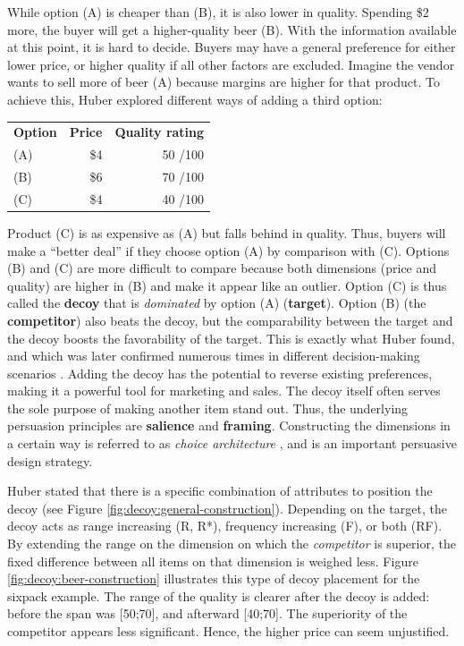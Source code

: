 While option (A) is cheaper than (B), it is also lower in quality. Spending \$2 more, the buyer will get a higher-quality beer (B). With the information available at this point, it is hard to decide. 
Buyers may have a general preference for either lower price, or higher quality if all other factors are excluded. Imagine the vendor wants to sell more of beer (A) because margins are higher for that product. To achieve this, Huber \etal explored different ways of adding a third option:
\begin{table}[!h]
\begin{tabular}{lrr}
	\textbf{Option} & \textbf{Price} & \textbf{Quality rating}\\
	(A) & \$4 & 50 \small{/100} \\
	(B) & \$6 & 70 \small{/100}\\
	(C) & \$4 & 40 \small{/100} \\
\end{tabular} 
\end{table}

Product (C) is as expensive as (A) but falls behind in quality. Thus, buyers will make a ``better deal'' if they choose option (A) by comparison with (C). Options (B) and (C) are more difficult to compare because both dimensions (price and quality) are higher in (B) and make it appear like an outlier. Option (C) is thus called the \textbf{decoy} that is \textit{dominated} by option (A) (\textbf{target}). Option (B) (the \textbf{competitor}) also beats the decoy, but the comparability between the target and the decoy boosts the favorability of the target. This is exactly what Huber \etal found, and which was later confirmed numerous times in different decision-making scenarios \cite{Ariely1995ExplanationSubjectiveDominance}. Adding the decoy has the potential to reverse existing preferences, making it a powerful tool for marketing and sales. The decoy itself often serves the sole purpose of making another item stand out. Thus, the underlying persuasion principles are \textbf{salience} and \textbf{framing}. Constructing the dimensions in a certain way is referred to as \textit{choice architecture} \cite{Thaler2010ChoiceArchitecture}, and is an important persuasive design strategy. 

Huber \etal stated that there is a specific combination of attributes to position the decoy (see Figure \ref{fig:decoy:general-construction}). Depending on the target, the decoy acts as range increasing (R, R*), frequency increasing (F), or both (RF). By extending the range on the dimension on which the \textit{competitor} is superior, the fixed difference between all items on that dimension is weighed less. Figure \ref{fig:decoy:beer-construction} illustrates this type of decoy placement for the sixpack example. The range of the quality is clearer after the decoy is added: before the span was [50;70], and afterward [40;70]. The superiority of the competitor appears less significant. Hence, the higher price can seem unjustified. 

